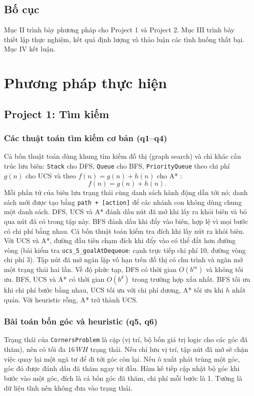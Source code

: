 \documentclass[conference]{IEEEtran}
\begin{document}
\subsection{Bố cục}
Mục II trình bày phương pháp cho Project 1 và Project 2. Mục III trình bày thiết lập thực nghiệm, kết quả định lượng và thảo luận các tình huống thất bại. Mục IV kết luận.

\section{Phương pháp thực hiện}

\subsection{Project 1: Tìm kiếm}

\subsubsection{Các thuật toán tìm kiếm cơ bản (q1--q4)}
Cả bốn thuật toán dùng khung tìm kiếm đồ thị (graph search) và chỉ khác cấu trúc lưu biên: \texttt{Stack} cho DFS, \texttt{Queue} cho BFS, \texttt{PriorityQueue} theo chi phí $g(n)$ cho UCS và theo $f(n)=g(n)+h(n)$ cho A* \cite{b1,b2,b5}:
\begin{equation}
f(n)=g(n)+h(n).\label{eq:astar}
\end{equation}
Mỗi phần tử của biên lưu trạng thái cùng danh sách hành động dẫn tới nó; danh sách mới được tạo bằng \texttt{path + [action]} để các nhánh con không dùng chung một danh sách. DFS, UCS và A* đánh dấu nút đã mở khi lấy ra khỏi biên và bỏ qua nút đã có trong tập này. BFS đánh dấu khi đẩy vào biên, hợp lệ vì mọi bước có chi phí bằng nhau. Cả bốn thuật toán kiểm tra đích khi lấy nút ra khỏi biên. Với UCS và A*, đường đầu tiên chạm đích khi đẩy vào có thể đắt hơn đường vòng (bài kiểm tra \texttt{ucs\_5\_goalAtDequeue}: cạnh trực tiếp chi phí 10, đường vòng chi phí 3). Tập nút đã mở ngăn lặp vô hạn trên đồ thị có chu trình và ngăn mở một trạng thái hai lần. Về độ phức tạp, DFS có thời gian $O(b^{m})$ và không tối ưu. BFS, UCS và A* có thời gian $O(b^{d})$ trong trường hợp xấu nhất. BFS tối ưu khi chi phí bước bằng nhau, UCS tối ưu với chi phí dương, A* tối ưu khi $h$ nhất quán. Với heuristic rỗng, A* trở thành UCS.

\subsubsection{Bài toán bốn góc và heuristic (q5, q6)}
Trạng thái của \texttt{CornersProblem} là cặp (vị trí, bộ bốn giá trị logic cho các góc đã thăm), nên có tối đa $16\,W\!H$ trạng thái. Nếu chỉ lưu vị trí, tập nút đã mở sẽ chặn việc quay lại một ngã tư để đi tới góc còn lại. Nếu ô xuất phát trùng một góc, góc đó được đánh dấu đã thăm ngay từ đầu. Hàm kế tiếp cập nhật bộ góc khi bước vào một góc, đích là cả bốn góc đã thăm, chi phí mỗi bước là 1. Tường là dữ liệu tĩnh nên không đưa vào trạng thái.
\end{document}
